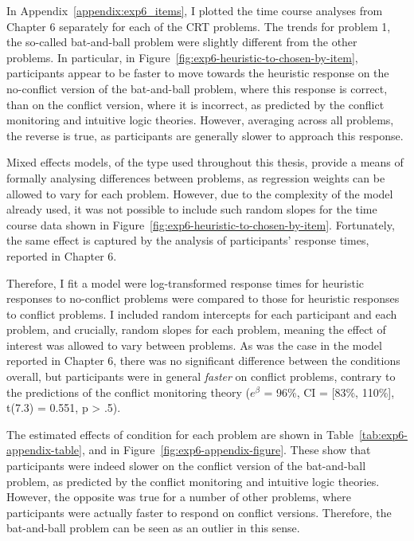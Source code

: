 
In Appendix~\ref{appendix:exp6_items},
I plotted the time course analyses from Chapter 6
separately for each of the CRT problems.
The trends for problem 1, the so-called bat-and-ball problem
were slightly different from the other problems.
In particular, in Figure~\ref{fig:exp6-heuristic-to-chosen-by-item},
participants appear to be faster to move towards the heuristic response
on the no-conflict version of the bat-and-ball problem,
where this response is correct,
than on the conflict version, where it is incorrect,
as predicted by the conflict monitoring and intuitive logic theories.
However, averaging across all problems,
the reverse is true, as participants are generally slower to approach this response.

Mixed effects models, of the type used throughout this thesis,
provide a means of formally analysing differences between problems,
as regression weights can be allowed to vary for each problem.
However, due to the complexity of the model already used,
it was not possible to include such random slopes
for the time course data shown in Figure~\ref{fig:exp6-heuristic-to-chosen-by-item}.
Fortunately, the same effect is captured
by the analysis of participants' response times, reported in Chapter 6.

Therefore, I fit a model were log-transformed response times
for heuristic responses to no-conflict problems
were compared to those for heuristic responses to conflict problems.
I included random intercepts for each participant and each problem,
and crucially, random slopes for each problem,
meaning the effect of interest was allowed to vary between problems.
As was the case in the model reported in Chapter 6,
there was no significant difference between the conditions overall,
but participants were in general \emph{faster} on conflict problems,
contrary to the predictions of the conflict monitoring theory
($e^{\beta}$ = 96\%, CI = [83\%, 110\%], t(7.3) = 0.551, p > .5).

The estimated effects of condition for each problem
are shown in Table~\ref{tab:exp6-appendix-table},
and in Figure~\ref{fig:exp6-appendix-figure}.
These show that participants were indeed slower
on the conflict version of the bat-and-ball problem,
as predicted by the conflict monitoring and intuitive logic theories.
However, the opposite was true for a number of other problems,
where participants were actually faster to respond
on conflict versions.
Therefore, the bat-and-ball problem
can be seen as an outlier in this sense.

